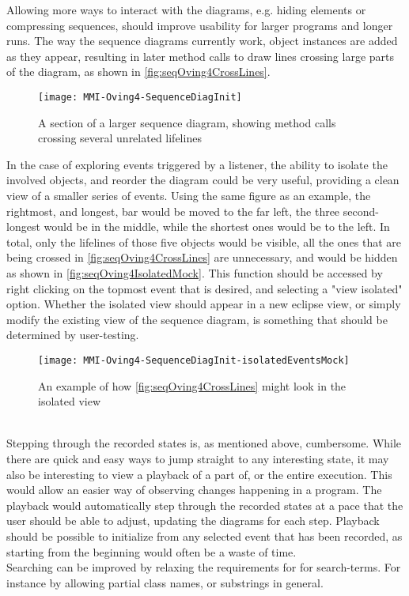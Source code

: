 Allowing more ways to interact with the diagrams, e.g. hiding elements or compressing sequences, should improve usability for larger programs and longer runs.
The way the sequence diagrams currently work, object instances are added as they appear, resulting in later method calls to draw lines crossing large parts of the diagram, as shown in \autoref{fig:seqOving4CrossLines}.
\begin{figure}[H]
	\centering
	\texttt{[image: MMI-Oving4-SequenceDiagInit]}
	\caption{A section of a larger sequence diagram, showing method calls crossing several unrelated lifelines}
	\label{fig:seqOving4CrossLines}
\end{figure}
In the case of exploring events triggered by a listener, the ability to isolate the involved objects, and reorder the diagram could be very useful, providing a clean view of a smaller series of events.%
Using the same figure as an example, the rightmost, and longest, bar would be moved to the far left, the three second-longest would be in the middle, while the shortest ones would be to the left.
In total, only the lifelines of those five objects would be visible, all the ones that are being crossed in \autoref{fig:seqOving4CrossLines} are unnecessary, and would be hidden as shown in \autoref{fig:seqOving4IsolatedMock}.
This function should be accessed by right clicking on the topmost event that is desired, and selecting a "view isolated" option.
Whether the isolated view should appear in a new eclipse view, or simply modify the existing view of the sequence diagram, is something that should be determined by user-testing.
\begin{figure}[H]
	\centering
	\texttt{[image: MMI-Oving4-SequenceDiagInit-isolatedEventsMock]}
	\caption{An example of how \autoref{fig:seqOving4CrossLines} might look in the isolated view}
	\label{fig:seqOving4IsolatedMock}
\end{figure}
~\\

Stepping through the recorded states is, as mentioned above, cumbersome.
While there are quick and easy ways to jump straight to any interesting state, it may also be interesting to view a playback of a part of, or the entire execution.
This would allow an easier way of observing changes happening in a program.
The playback would automatically step through the recorded states at a pace that the user should be able to adjust, updating the diagrams for each step.
Playback should be possible to initialize from any selected event that has been recorded, as starting from the beginning would often be a waste of time.
~\\

Searching can be improved by relaxing the requirements for for search-terms.
For instance by allowing partial class names, or substrings in general.

